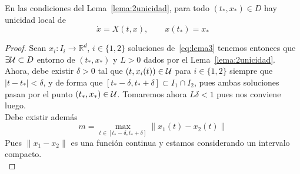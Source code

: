 \begin{lema}\label{lema:3unicidad}
    En las condiciones del Lema~\ref{lema:2unicidad}, para todo $(t_\ast,x_\ast)\in D$ hay unicidad local de
    \begin{equation}\label{eq:lema3}
        \dot{x} = X(t,x), \qquad x(t_\ast) = x_\ast
    \end{equation}
    \begin{proof}
        Sean $x_i:I_i\to \mathbb{R}^d$, $i \in \{1,2\}$ soluciones de~\eqref{eq:lema3} tenemos entonces que $\exists \mathcal{U}\subset D$ entorno de $(t_\ast,x_\ast)$ y $L>0$ dados por el Lema~\ref{lema:2unicidad}.\\

        \noindent
        Ahora, debe existir $\delta>0$ tal que $(t,x_i(t))\in \mathcal{U}$ para $i \in \{1,2\}$ siempre que $|t-t_\ast|<\delta$, y de forma que $[t_\ast-\delta,t_\ast+\delta]\subset I_1\cap I_2$, pues ambas soluciones pasan por el punto $(t_\ast,x_\ast)\in \mathcal{U}$. Tomaremos ahora $L\delta < 1$ pues nos conviene luego.\\

        \noindent
        Debe existir además 
        \begin{equation*}
            m = \max_{t\in [t_\ast - \delta, t_\ast + \delta]} \|x_1(t) - x_2(t)\|
        \end{equation*}
        Pues $\|x_1 - x_2\|$ es una función continua y estamos considerando un intervalo compacto.\\


\end{proof}
\end{lema}
